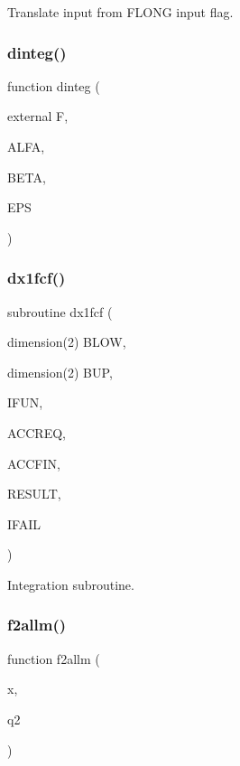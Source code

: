 Translate input from F\+L\+O\+NG input flag. 

\mbox{\label{djangoh__h_8f_a8f516ecea0c35714a195bc2245c008ec}} 
\subsubsection{\texorpdfstring{dinteg()}{dinteg()}}
{\footnotesize\ttfamily function dinteg (\begin{DoxyParamCaption}\item[{external}]{F,  }\item[{}]{A\+L\+FA,  }\item[{}]{B\+E\+TA,  }\item[{}]{E\+PS }\end{DoxyParamCaption})}

\mbox{\label{djangoh__h_8f_a4f17d177d9df6c5976dd9b3fba939dec}} 
\subsubsection{\texorpdfstring{dx1fcf()}{dx1fcf()}}
{\footnotesize\ttfamily subroutine dx1fcf (\begin{DoxyParamCaption}\item[{dimension(2)}]{B\+L\+OW,  }\item[{dimension(2)}]{B\+UP,  }\item[{}]{I\+F\+UN,  }\item[{}]{A\+C\+C\+R\+EQ,  }\item[{}]{A\+C\+C\+F\+IN,  }\item[{}]{R\+E\+S\+U\+LT,  }\item[{}]{I\+F\+A\+IL }\end{DoxyParamCaption})}



Integration subroutine. 

\mbox{\label{djangoh__h_8f_a1e585c73c2d45b50e390fbb6017e4668}} 
\subsubsection{\texorpdfstring{f2allm()}{f2allm()}}
{\footnotesize\ttfamily function f2allm (\begin{DoxyParamCaption}\item[{}]{x,  }\item[{}]{q2 }\end{DoxyParamCaption})}

